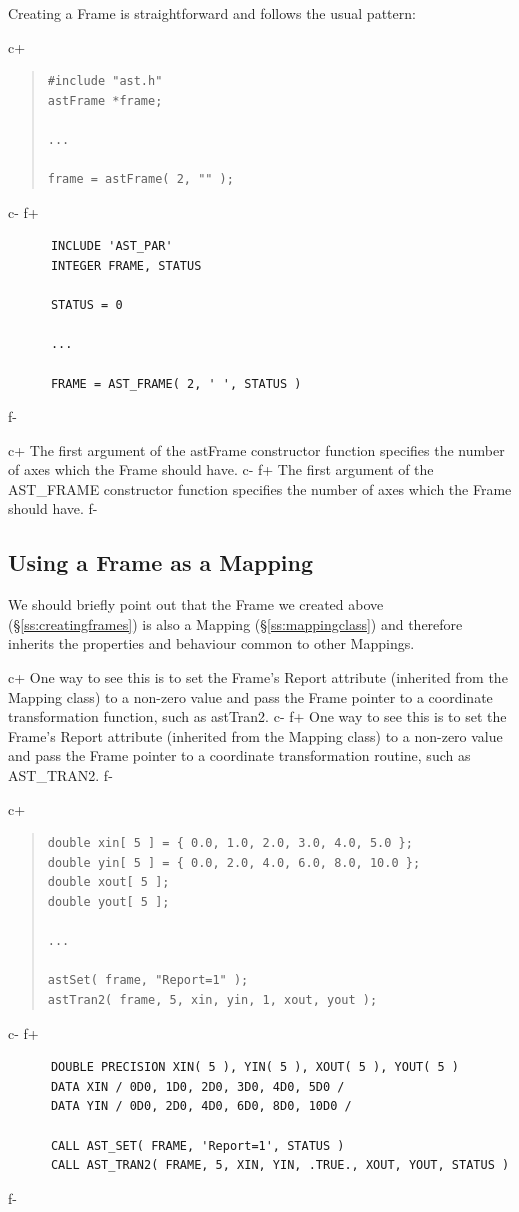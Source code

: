 \documentclass[twoside,11pt]{article}
\newcommand{\secref}[1]{\S\ref{#1}}
\newcommand{\secref}[1]{\ref{#1}}
\begin{document}
Creating a Frame is straightforward and follows the usual pattern:

c+
\begin{quote}
\small
\begin{verbatim}
#include "ast.h"
astFrame *frame;

...

frame = astFrame( 2, "" );
\end{verbatim}
\normalsize
\end{quote}
c-
f+
\small
\begin{verbatim}
      INCLUDE 'AST_PAR'
      INTEGER FRAME, STATUS

      STATUS = 0

      ...

      FRAME = AST_FRAME( 2, ' ', STATUS )
\end{verbatim}
\normalsize
f-

c+
The first argument of the astFrame constructor function specifies the
number of axes which the Frame should have.
c-
f+
The first argument of the AST\_FRAME constructor function specifies
the number of axes which the Frame should have.
f-

\subsection{\label{ss:frameasmapping}Using a Frame as a Mapping}

We should briefly point out that the Frame we created above
(\secref{ss:creatingframes}) is also a Mapping
(\secref{ss:mappingclass}) and therefore inherits the properties and
behaviour common to other Mappings.

c+
One way to see this is to set the Frame's Report attribute (inherited
from the Mapping class) to a non-zero value and pass the Frame pointer
to a coordinate transformation function, such as astTran2.
c-
f+
One way to see this is to set the Frame's Report attribute (inherited
from the Mapping class) to a non-zero value and pass the Frame pointer
to a coordinate transformation routine, such as AST\_TRAN2.
f-

c+
\begin{quote}
\small
\begin{verbatim}
double xin[ 5 ] = { 0.0, 1.0, 2.0, 3.0, 4.0, 5.0 };
double yin[ 5 ] = { 0.0, 2.0, 4.0, 6.0, 8.0, 10.0 };
double xout[ 5 ];
double yout[ 5 ];

...

astSet( frame, "Report=1" );
astTran2( frame, 5, xin, yin, 1, xout, yout );
\end{verbatim}
\normalsize
\end{quote}
c-
f+
\small
\begin{verbatim}
      DOUBLE PRECISION XIN( 5 ), YIN( 5 ), XOUT( 5 ), YOUT( 5 )
      DATA XIN / 0D0, 1D0, 2D0, 3D0, 4D0, 5D0 /
      DATA YIN / 0D0, 2D0, 4D0, 6D0, 8D0, 10D0 /

      CALL AST_SET( FRAME, 'Report=1', STATUS )
      CALL AST_TRAN2( FRAME, 5, XIN, YIN, .TRUE., XOUT, YOUT, STATUS )
\end{verbatim}
\normalsize
f-
\end{document}
